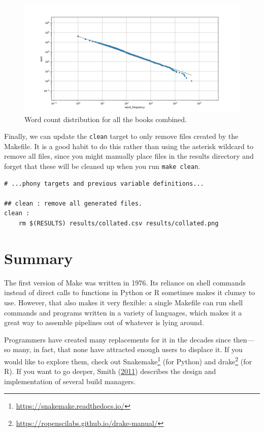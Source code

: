 \documentclass[
]{krantz}
\renewcommand{\href}[2]{#2\footnote{\url{#1}}}
\begin{document}
\begin{figure}

{\centering \includegraphics[width=1\linewidth]{figures/automate/collated} 

}

\caption{Word count distribution for all the books combined.}\label{fig:automate-collated}
\end{figure}

Finally,
we can update the \texttt{clean} target
to only remove files created by the Makefile.
It is a good habit to do this rather than using the asterisk wildcard to remove all files,
since you might manually place files in the results directory
and forget that these will be cleaned up when you run \texttt{make\ clean}.

\begin{verbatim}
# ...phony targets and previous variable definitions...

## clean : remove all generated files.
clean :
    rm $(RESULTS) results/collated.csv results/collated.png
\end{verbatim}

\hypertarget{automate-summary}{%
\section{Summary}\label{automate-summary}}

The first version of Make was written in 1976.
Its reliance on shell commands instead of direct calls to functions in Python or R
sometimes makes it clumsy to use.
However,
that also makes it very flexible:
a single Makefile can run shell commands and programs written in a variety of languages,
which makes it a great way to assemble pipelines out of whatever is lying around.

Programmers have created many replacements for it in the decades since then---so many,
in fact,
that none have attracted enough users to displace it.
If you would like to explore them,
check out \href{https://snakemake.readthedocs.io/}{Snakemake} (for Python)
and \href{https://ropenscilabs.github.io/drake-manual/}{drake} (for R).
If you want to go deeper,
Smith (\protect\hyperlink{ref-Smit2011}{2011}) describes the design and implementation of several build managers.
\end{document}
